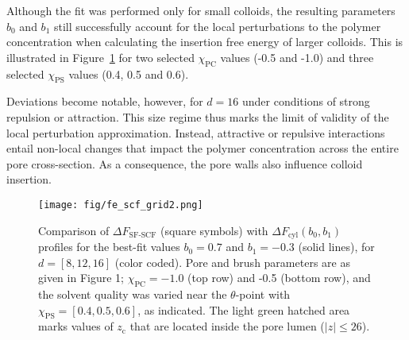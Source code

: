\documentclass[10pt, a4paper, twocolumn]{article}
\newcommand{\todo}[1]{\pdfcomment{#1}} %
\begin{document}
Although the fit was performed only for small colloids, the resulting parameters $b_{0}$ and $b_{1}$ still successfully account for the local perturbations to the polymer concentration when calculating the insertion free energy of larger colloids.
This is illustrated in Figure~\ref{fig:fe_scf_grid} for two selected $\chi_{\text{PC}}$ values (-0.5 and -1.0) and three selected $\chi_{\text{PS}}$ values (0.4, 0.5 and 0.6).

Deviations become notable, however, for $d = 16$ under conditions of strong repulsion or attraction.
This size regime thus marks the limit of validity of the local perturbation approximation.
Instead, attractive or repulsive interactions entail non-local changes that impact the polymer concentration across the entire pore cross-section.
As a consequence, the pore walls also influence colloid insertion. 

\begin{figure}[]
    \centering
    \texttt{[image: fig/fe\_scf\_grid2.png]}
    \caption{ 
    Comparison of $\Delta F_{\text{SF-SCF}}$ (square symbols) with $\Delta F_{\text{cyl}}(b_0,b_1)$ profiles for the best-fit values $b_0 = 0.7$ and $b_1 = -0.3$ (solid lines), for $d = [8, 12, 16]$ (color coded).
    Pore and brush parameters are as given in Figure 1; $\chi_{\text{PC}} = -1.0$ (top row) and -0.5 (bottom row), and the solvent quality was varied near the $\theta$-point with $\chi_{\text{PS}} = [0.4, 0.5, 0.6]$, as indicated.
    The light green hatched area marks values of $z_{\text{c}}$ that are located inside the pore lumen ($|z| \leq 26$).
    \label{fig:fe_scf_grid}
    }
\end{figure}

\end{document}
